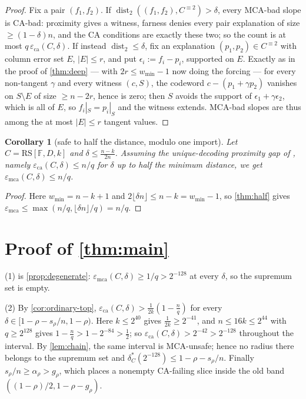 \documentclass[11pt]{amsart}
\newtheorem{corollary}[corollary]{Corollary}
\theoremstyle{definition}
\theoremstyle{remark}
\newcommand{\F}{\mathbb{F}}
\newcommand{\RS}{\mathrm{RS}}
\newcommand{\dist}{\operatorname{dist}}
\newcommand{\eca}{\varepsilon_{\mathrm{ca}}}
\newcommand{\emca}{\varepsilon_{\mathrm{mca}}}
\begin{document}
\begin{proof}
Fix a pair $(f_1,f_2)$. If $\dist_2((f_1,f_2),C^{\equiv2})>\delta$, every MCA-bad slope is CA-bad: proximity gives a witness, farness denies every pair explanation of size $\ge(1-\delta)n$, and the CA conditions are exactly these two; so the count is at most $q\,\eca(C,\delta)$. If instead $\dist_2\le\delta$, fix an explanation $(p_1,p_2)\in C^{\equiv2}$ with column error set $E$, $|E|\le r$, and put $\epsilon_i:=f_i-p_i$, supported on $E$. Exactly as in the proof of \cref{thm:deep} --- with $2r\le w_{\min}-1$ now doing the forcing --- for every non-tangent $\gamma$ and every witness $(c,S)$, the codeword $c-(p_1+\gamma p_2)$ vanishes on $S\setminus E$ of size $\ge n-2r$, hence is zero; then $S$ avoids the support of $\epsilon_1+\gamma\epsilon_2$, which is all of $E$, so $f_i|_S=p_i|_S$ and the witness extends. MCA-bad slopes are thus among the at most $|E|\le r$ tangent values.
\end{proof}

\begin{corollary}[safe to half the distance, modulo one import]\label{cor:import}
Let $C=\RS[\F,D,k]$ and $\delta\le\frac{n-k}{2n}$. Assuming the unique-decoding proximity gap of \textup{\cite[Thm.~4.1]{BCIKS20}}, namely $\eca(C,\delta)\le n/q$ for $\delta$ up to half the minimum distance, we get $\emca(C,\delta)\le n/q$.
\end{corollary}

\begin{proof}
Here $w_{\min}=n-k+1$ and $2\lfloor\delta n\rfloor\le n-k=w_{\min}-1$, so \cref{thm:half} gives $\emca\le\max(n/q,\lfloor\delta n\rfloor/q)=n/q$.
\end{proof}

\section{Proof of \texorpdfstring{\cref{thm:main}}{Theorem 1.1}}\label{sec:proof-main}

(1) is \cref{prop:degenerate}: $\emca(C,\delta)\ge1/q>2^{-128}$ at every $\delta$, so the supremum set is empty.

(2) By \cref{cor:ordinary-top}, $\eca(C,\delta)>\frac1{2k}(1-\frac nq)$ for every $\delta\in[1-\rho-s_\rho/n,1-\rho)$. Here $k\le2^{40}$ gives $\frac1{2k}\ge2^{-41}$, and $n\le16k\le2^{44}$ with $q\ge2^{128}$ gives $1-\frac nq>1-2^{-84}>\frac12$; so $\eca(C,\delta)>2^{-42}>2^{-128}$ throughout the interval. By \cref{lem:chain}, the same interval is MCA-unsafe; hence no radius there belongs to the supremum set and $\delta^*_C(2^{-128})\le1-\rho-s_\rho/n$. Finally $s_\rho/n\ge\alpha_\rho>g_\rho$, which places a nonempty CA-failing slice inside the old band $((1-\rho)/2,1-\rho-g_\rho)$.
\end{document}
